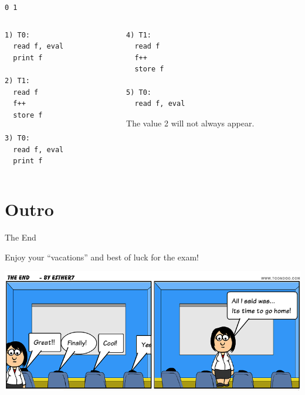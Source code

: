\begin{frame}[fragile]{\lstinline{0 1}}
  \begin{columns}[t]
    \begin{column}{0.5\textwidth}
  \begin{lstlisting}
1) T0:
  read f, eval 
  print f

2) T1: 
  read f
  f++
  store f

3) T0: 
  read f, eval
  print f
  \end{lstlisting}
    \end{column}
    \begin{column}{0.5\textwidth}
  \begin{lstlisting}
4) T1:
  read f
  f++
  store f

5) T0:
  read f, eval
  \end{lstlisting}

  The value 2 will not always appear.
    \end{column}
  \end{columns}
\end{frame}


\section*{Outro}

\begin{frame}{The End}
  \begin{center}
    \huge{Enjoy your ``vacations'' and best of luck for the exam!}
  \end{center}


  \begin{center}
    \includegraphics[scale=0.3]{figures/the-end}
  \end{center}
\end{frame}


